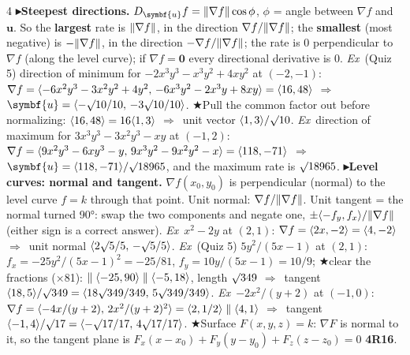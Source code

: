 \documentclass{article}
\newcommand\vb[1]{\symbf{#1}}                         %
\newcommand\nm[1]{\mathopen{\smash{\lVert}}#1\mathclose{\smash{\rVert}}}     %
\newcommand\ip[1]{\mathopen{\smash{\langle}}#1\mathclose{\smash{\rangle}}}   %
\newcommand\cm{,\allowbreak\,}                        %
\newcommand\sh[1]{{\setlength\fboxsep{0.18pt}\colorbox{black!22}{\textbf{#1}}}}  %
\newcommand\pt[1]{\textbf{{\symf ▸}#1}}       %
\newcommand\ex{\textit{Ex}\ }                  %
\newcommand\shc{{\symf ★}}                      %
\newcommand\rt{\smash{\surd}}                  %
\newcommand\then{\ensuremath{\Rightarrow}}
\newcommand\gr{\nabla}
\begin{document}
\begin{multicols*}{4}
\pt{Steepest directions.} $D_{\vb u}f=\nm{\gr f}\cos\phi$, $\phi$ = angle between $\gr f$ and $\vb u$. So the \textbf{largest} rate is $\nm{\gr f}$, in the direction $\gr f/\nm{\gr f}$; the \textbf{smallest} (most negative) is $-\nm{\gr f}$, in the direction $-\gr f/\nm{\gr f}$; the rate is 0 perpendicular to $\gr f$ (along the level curve); if $\gr f=\vb0$ every directional derivative is 0. \ex (Quiz 5) direction of minimum for $-2x^3y^3-x^3y^2+4xy^2$ at $(-2,-1)$: $\gr f=\ip{-6x^2y^3-3x^2y^2+4y^2\cm-6x^3y^2-2x^3y+8xy}=\ip{16,48}$ \then\ $\vb u=\ip{-\rt10/10\cm-3\rt10/10}$. \shc Pull the common factor out before normalizing: $\ip{16,48}=16\ip{1,3}$ \then\ unit vector $\ip{1,3}/\rt10$. \ex direction of maximum for $3x^3y^3-3x^2y^3-xy$ at $(-1,2)$: $\gr f=\ip{9x^2y^3-6xy^3-y\cm9x^3y^2-9x^2y^2-x}=\ip{118,-71}$ \then\ $\vb u=\ip{118,-71}/\rt18965$, and the maximum rate is $\rt18965$.
\pt{Level curves: normal and tangent.} $\gr f(x_0,y_0)$ is perpendicular (normal) to the level curve $f=k$ through that point. Unit normal: $\gr f/\nm{\gr f}$. Unit tangent = the normal turned 90°: swap the two components and negate one, $\pm\ip{-f_y,f_x}/\nm{\gr f}$ (either sign is a correct answer). \ex $x^2-2y$ at $(2,1)$: $\gr f=\ip{2x,-2}=\ip{4,-2}$ \then\ unit normal $\ip{2\rt5/5\cm-\rt5/5}$. \ex (Quiz 5) $5y^2/(5x-1)$ at $(2,1)$: $f_x=-25y^2/(5x-1)^2=-25/81$, $f_y=10y/(5x-1)=10/9$; \shc clear the fractions (×81): $\parallel\ip{-25,90}\parallel\ip{-5,18}$, length $\rt349$ \then\ tangent $\ip{18,5}/\rt349=\ip{18\rt349/349\cm5\rt349/349}$. \ex $-2x^2/(y+2)$ at $(-1,0)$: $\gr f=\ip{-4x/(y+2)\cm2x^2/(y+2)^2}=\ip{2,1/2}\parallel\ip{4,1}$ \then\ tangent $\ip{-1,4}/\rt17=\ip{-\rt17/17\cm4\rt17/17}$. \shc Surface $F(x,y,z)=k$: $\gr F$ is normal to it, so the tangent plane is $F_x(x-x_0)+F_y(y-y_0)+F_z(z-z_0)=0$ \sh{4R16}.


\end{multicols*}
\end{document}
